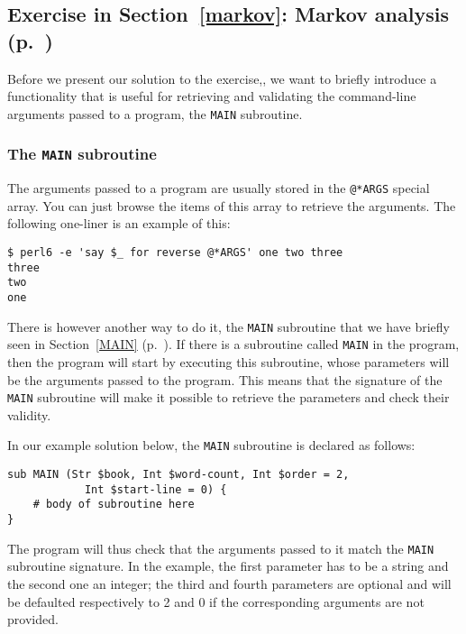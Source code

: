 {\subsection{Exercise in Section~\ref{markov}: Markov analysis (p.~\pageref{markov_analysis})}
\label{sol_markov_analysis}

Before we present our solution to the exercise,, we want 
to briefly introduce a functionality that is useful for 
retrieving and validating the command-line arguments passed 
to a program, the {\tt MAIN} subroutine.

\subsubsection{The {\tt MAIN} subroutine}
\label{MAIN_sub}

The arguments passed to a program are usually stored in the 
\verb'@*ARGS' special array. You can just browse the items of this 
array to retrieve the arguments. The following one-liner is 
an example of this:

\begin{verbatim}
$ perl6 -e 'say $_ for reverse @*ARGS' one two three
three
two
one
\end{verbatim}

There is however another way to do it, the {\tt MAIN} 
subroutine that we have briefly seen in Section~\ref{MAIN} 
(p.~\pageref{MAIN}). If there is a subroutine 
called {\tt MAIN} in the program, then the program will start 
by executing this subroutine, whose parameters will be the 
arguments passed to the program. This means that the signature 
of the {\tt MAIN} subroutine will make it possible to retrieve the 
parameters and check their validity.

In our example solution below, the {\tt MAIN} subroutine is declared 
as follows:

\begin{verbatim}
sub MAIN (Str $book, Int $word-count, Int $order = 2, 
            Int $start-line = 0) {
    # body of subroutine here
}
\end{verbatim}

The program will thus check that the arguments passed to it match 
the {\tt MAIN} subroutine signature. In the example, the first 
parameter has to be a string and the second one an integer; the 
third and fourth parameters are optional and will be defaulted 
respectively to 2 and 0 if the corresponding arguments are not 
provided.

}
